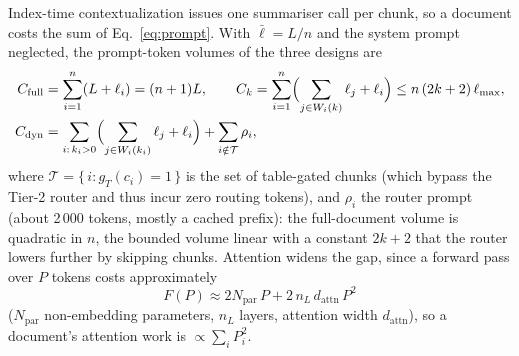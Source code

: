 \documentclass[pdflatex,sn-mathphys-num]{sn-jnl}
\theoremstyle{thmstyleone}%
\theoremstyle{thmstylethree}%
\begin{document}
Index-time contextualization issues one summariser call per chunk, so a document costs the sum of Eq.~\eqref{eq:prompt}. With $\bar\ell=L/n$ and the system prompt neglected, the prompt-token volumes of the three designs are
\begin{align}
C_{\mathrm{full}}&=\sum_{i=1}^{n}(L+\ell_i)=(n+1)L,\qquad
C_{k}=\sum_{i=1}^{n}\Bigl(\sum_{j\in W_i(k)}\ell_j+\ell_i\Bigr)\le n\,(2k+2)\,\ell_{\max},\nonumber\\
C_{\mathrm{dyn}}&=\sum_{i:\,k_i>0}\Bigl(\sum_{j\in W_i(k_i)}\ell_j+\ell_i\Bigr)+\sum_{i\notin\mathcal T}\rho_i,\label{eq:volume}
\end{align}
where $\mathcal T=\{\, i: g_T(c_i)=1\,\}$ is the set of table-gated chunks (which bypass the Tier-2 router and thus incur zero routing tokens), and $\rho_i$ the router prompt (about 2\,000 tokens, mostly a cached prefix): the full-document volume is quadratic in $n$, the bounded volume linear with a constant $2k+2$ that the router lowers further by skipping chunks. Attention widens the gap, since a forward pass over $P$ tokens costs approximately \cite{kaplan2020scaling}
\begin{equation}\label{eq:flops}
F(P)\approx 2N_{\mathrm{par}}\,P+2\,n_L\,d_{\mathrm{attn}}\,P^{2}
\end{equation}
($N_{\mathrm{par}}$ non-embedding parameters, $n_L$ layers, attention width $d_{\mathrm{attn}}$), so a document's attention work is $\propto\sum_i P_i^2$.
\end{document}
